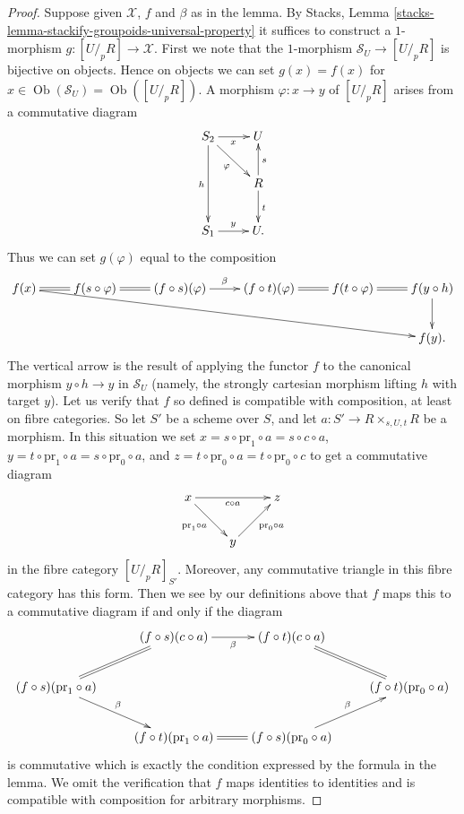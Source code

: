 \documentclass{stacks-project}
\theoremstyle{plain}
\theoremstyle{definition}
\theoremstyle{remark}
\numberwithin{equation}{subsection}
\def\Ob{\mathop{\mathrm{Ob}}\nolimits}
\begin{document}
\begin{proof}
Suppose given $\mathcal{X}$, $f$ and $\beta$ as in the lemma. By
Stacks, Lemma \ref{stacks-lemma-stackify-groupoids-universal-property}
it suffices to construct a $1$-morphism $g : [U/_{\!p}R] \to \mathcal{X}$.
First we note that the $1$-morphism
$\mathcal{S}_U \to [U/_{\!p}R]$ is bijective on objects.
Hence on objects we can set $g(x) = f(x)$ for
$x \in \Ob(\mathcal{S}_U) = \Ob([U/_{\!p}R])$.
A morphism $\varphi : x \to y$ of $[U/_{\!p}R]$ arises from a
commutative diagram
$$
\xymatrix{
S_2 \ar[dd]_h \ar[r]_x \ar[dr]_\varphi & U \\
& R \ar[u]_s \ar[d]^t \\
S_1 \ar[r]^y & U.
}
$$
Thus we can set $g(\varphi)$ equal to the composition
$$
\xymatrix{
f(x) \ar@{=}[r] \ar[rrrrrd] &
f(s \circ \varphi) \ar@{=}[r] &
(f \circ s)(\varphi) \ar[r]^\beta &
(f \circ t)(\varphi) \ar@{=}[r] &
f(t \circ \varphi) \ar@{=}[r] &
f(y \circ h) \ar[d] \\
& & & & & f(y).
}
$$
The vertical arrow is the result of applying the functor $f$ to the
canonical morphism $y \circ h \to y$ in $\mathcal{S}_U$ (namely, the
strongly cartesian morphism lifting $h$ with target $y$).
Let us verify that $f$ so defined is compatible with composition, at least
on fibre categories. So let $S'$ be a scheme over $S$, and let
$a : S' \to R \times_{s, U, t} R$ be a morphism. In this situation
we set $x = s \circ \text{pr}_1 \circ a = s \circ c \circ a$,
$y = t \circ \text{pr}_1 \circ a = s \circ \text{pr}_0 \circ a$, and
$z = t \circ \text{pr}_0 \circ a = t \circ \text{pr}_0 \circ c$ to
get a commutative diagram
$$
\xymatrix{
x \ar[rr]_{c \circ a} \ar[rd]_{\text{pr}_1 \circ a} & & z \\
& y \ar[ru]_{\text{pr}_0 \circ a}
}
$$
in the fibre category $[U/_{\!p}R]_{S'}$. Moreover, any commutative
triangle in this fibre category has this form. Then we see by our definitions
above that $f$ maps this to a commutative diagram if and only if
the diagram
$$
\xymatrix{
& (f \circ s)(c \circ a) \ar[r]_-{\beta} &
(f \circ t)(c \circ a) \ar@{=}[rd] & \\
(f \circ s)(\text{pr}_1 \circ a) \ar[rd]^\beta \ar@{=}[ru] & & &
(f \circ t)(\text{pr}_0 \circ a) \\
& (f \circ t)(\text{pr}_1 \circ a) \ar@{=}[r] &
(f \circ s)(\text{pr}_0 \circ a) \ar[ru]^\beta
}
$$
is commutative which is exactly the condition expressed by the formula
in the lemma. We omit the
verification that $f$ maps identities to identities and is compatible
with composition for arbitrary morphisms.
\end{proof}
\end{document}
